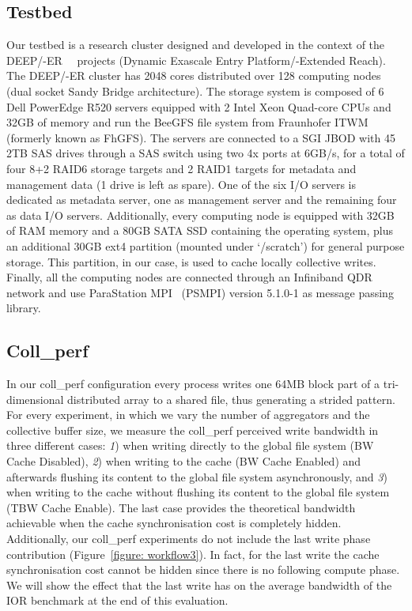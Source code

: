 \subsection{Testbed}
\label{subsec: testbed}
Our testbed is a research cluster designed and developed in the context of the DEEP/-ER~\cite{deep}~\cite{deep-er} projects (Dynamic Exascale Entry Platform/-Extended Reach). The DEEP/-ER cluster has 2048 cores distributed over 128 computing nodes (dual socket Sandy Bridge architecture). The storage system is composed of 6 Dell PowerEdge R520 servers equipped with 2 Intel Xeon Quad-core CPUs and 32GB of memory and run the BeeGFS file system from Fraunhofer ITWM~\cite{fhgfs} (formerly known as FhGFS). The servers are connected to a SGI JBOD with 45 2TB SAS drives through a SAS switch using two 4x ports at 6GB/s, for a total of four 8+2 RAID6 storage targets and 2 RAID1 targets for metadata and management data (1 drive is left as spare). One of the six I/O servers is dedicated as metadata server, one as management server and the remaining four as data I/O servers.
Additionally, every computing node is equipped with 32GB of RAM memory and a 80GB SATA SSD containing the operating system, plus an additional 30GB ext4 partition (mounted under `/scratch') for general purpose storage. This partition, in our case, is used to cache locally collective writes. Finally, all the computing nodes are connected through an Infiniband QDR network and use ParaStation MPI~\cite{parastation} (PSMPI) version 5.1.0-1 as message passing library.

\subsection{Coll\_perf}
\label{subsec: coll_perf}
In our coll\_perf configuration every process writes one 64MB block part of a tri-dimensional distributed array to a shared file, thus generating a strided pattern. For every experiment, in which we vary the number of aggregators and the collective buffer size, we measure the coll\_perf perceived write bandwidth in three different cases: \textit{1}) when writing directly to the global file system (BW Cache Disabled), \textit{2}) when writing to the cache (BW Cache Enabled) and afterwards flushing its content to the global file system asynchronously, and \textit{3}) when writing to the cache without flushing its content to the global file system (TBW Cache Enable). The last case provides the theoretical bandwidth achievable when the cache synchronisation cost is completely hidden. Additionally, our coll\_perf experiments do not include the last write phase contribution (Figure~\ref{figure: workflow3}). In fact, for the last write the cache synchronisation cost cannot be hidden since there is no following compute phase. We will show the effect that the last write has on the average bandwidth of the IOR benchmark at the end of this evaluation.

